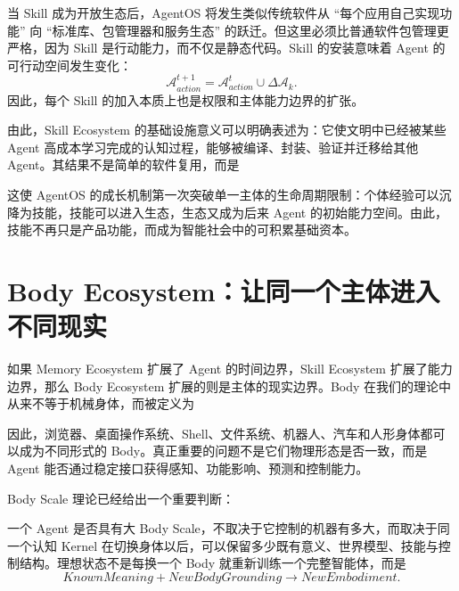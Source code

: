 当 Skill 成为开放生态后，AgentOS 将发生类似传统软件从 ``每个应用自己实现功能'' 向 ``标准库、包管理器和服务生态'' 的跃迁。但这里必须比普通软件包管理更严格，因为 Skill 是行动能力，而不仅是静态代码。Skill 的安装意味着 Agent 的可行动空间发生变化：
\[
\mathcal A_{action}^{t+1}
=
\mathcal A_{action}^{t}
\cup
\Delta \mathcal A_k.
\]
因此，每个 Skill 的加入本质上也是权限和主体能力边界的扩张。

由此，Skill Ecosystem 的基础设施意义可以明确表述为：它使文明中已经被某些 Agent 高成本学习完成的认知过程，能够被编译、封装、验证并迁移给其他 Agent。其结果不是简单的软件复用，而是
\begin{statementbox}
\centering
{}
\end{statementbox}
这使 AgentOS 的成长机制第一次突破单一主体的生命周期限制：个体经验可以沉降为技能，技能可以进入生态，生态又成为后来 Agent 的初始能力空间。由此，技能不再只是产品功能，而成为智能社会中的可积累基础资本。

\section{Body Ecosystem：让同一个主体进入不同现实}

如果 Memory Ecosystem 扩展了 Agent 的时间边界，Skill Ecosystem 扩展了能力边界，那么 Body Ecosystem 扩展的则是主体的现实边界。Body 在我们的理论中从来不等于机械身体，而被定义为
\begin{statementbox}
\centering
{}
\end{statementbox}
因此，浏览器、桌面操作系统、Shell、文件系统、机器人、汽车和人形身体都可以成为不同形式的 Body。真正重要的问题不是它们物理形态是否一致，而是 Agent 能否通过稳定接口获得感知、功能影响、预测和控制能力。

Body Scale 理论已经给出一个重要判断：
\begin{statementbox}
\centering
{}
\end{statementbox}
一个 Agent 是否具有大 Body Scale，不取决于它控制的机器有多大，而取决于同一个认知 Kernel 在切换身体以后，可以保留多少既有意义、世界模型、技能与控制结构。理想状态不是每换一个 Body 就重新训练一个完整智能体，而是
\[
KnownMeaning
+
NewBodyGrounding
\rightarrow
NewEmbodiment.
\]

